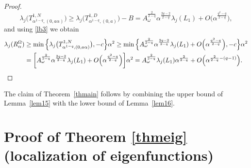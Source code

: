 \documentclass[11pt,oneside,reqno,a4paper]{amsart}
\theoremstyle{definition}
\begin{document}
\begin{proof}
\[\lambda_j\big(T^{1,N}_{\alpha^{1-q},(0,a\alpha)}\big)\ge \lambda_j\Big(
T^{1,D}_{\alpha^{1-q},(0,a)}\Big)-B=A_\omega^\frac{2}{2-q}\alpha^\frac{2q-2}{2-q}\lambda_j(L_1)+O\Big(\alpha^{\frac{q^2-q}{2-q}}\Big),
\]
and using \eqref{lb3} we obtain
\begin{align*}
		\lambda_j(R^\Omega_\alpha)&\ge \min\Big\{\lambda_j\big(T^{1,N}_{\alpha^{1-q},(0,a\alpha)}\big),-c\Big\}\alpha^2\ge  \min\Big\{A_\omega^\frac{2}{2-q}\alpha^\frac{2q-2}{2-q}\lambda_j(L_1)+O\Big(\alpha^{\frac{q^2-q}{2-q}}\Big),-c\Big\}\alpha^2\\
		&=\bigg[ A_\omega^\frac{2}{2-q}\alpha^\frac{2q-2}{2-q}\lambda_j(L_1)+O\Big(\alpha^{\frac{q^2-q}{2-q}}\Big) \bigg]\alpha^2=A_\omega^\frac{2}{2-q} \lambda_j(L_1) \alpha^\frac{2}{2-q}+O\Big(\alpha^{\frac{2}{2-q}-(q-1)}\Big). \qedhere
\end{align*}
\end{proof}

The claim of Theorem~\ref{thmain} follows by combining the upper bound
of Lemma~\ref{lem15} with the lower bound of Lemma~\ref{lem16}.



\section{Proof of Theorem \ref{thmeig} (localization of eigenfunctions)}\label{eigenfunctions}
\end{document}
